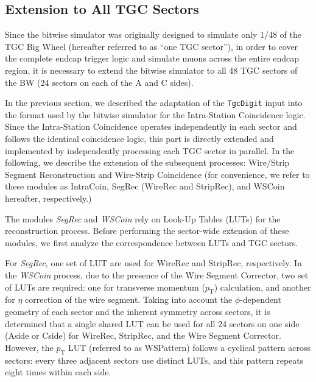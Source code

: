 \subsection{Extension to All TGC Sectors} \label{subsec:Extension}
Since the bitwise simulator was originally designed to simulate only 1/48 of the TGC Big Wheel (hereafter referred to as “one TGC sector”), in order to cover the complete endcap trigger logic and simulate muons across the entire endcap region, it is necessary to extend the bitwise simulator to all 48 TGC sectors of the BW (24 sectors on each of the A and C sides).

In the previous section, we described the adaptation of the \texttt{TgcDigit} input into the format used by the bitwise simulator for the Intra-Station Coincidence logic. Since the Intra-Station Coincidence operates independently in each sector and follows the identical coincidence logic, this part is directly extended and implemented by independently processing each TGC sector in parallel. In the following, we describe the extension of the subsequent processes: Wire/Strip Segment Reconstruction and Wire-Strip Coincidence (for convenience, we refer to these modules as IntraCoin, SegRec (WireRec and StripRec), and WSCoin hereafter, respectively.)

The modules \textit{SegRec} and \textit{WSCoin} rely on Look-Up Tables (LUTs) for the reconstruction process. Before performing the sector-wide extension of these modules, we first analyze the correspondence between LUTs and TGC sectors.

For \textit{SegRec}, one set of LUT are used for WireRec and StripRec, respectively. In the \textit{WSCoin} process, due to the presence of the Wire Segment Corrector, two set of LUTs are required: one for transverse momentum ($p_\mathrm{T}$) calculation, and another for $\eta$ correction of the wire segment. Taking into account the $\phi$-dependent geometry of each sector and the inherent symmetry across sectors, it is determined that a single shared LUT can be used for all 24 sectors on one side (Aside or Cside) for WireRec, StripRec, and the Wire Segment Corrector. However, the $p_\mathrm{T}$ LUT (referred to as WSPattern) follows a cyclical pattern across sectors: every three adjacent sectors use distinct LUTs, and this pattern repeats eight times within each side.

